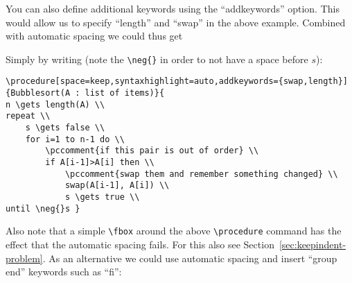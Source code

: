 \documentclass[a4paper]{report}
\begin{document}
You can also define additional keywords using the \enquote{addkeywords} option. This would allow us to specify \enquote{length} and \enquote{swap} in the above example. Combined with automatic spacing we could thus get
\begin{center}
\end{center}
Simply by writing (note the \lstinline$\neg{}$ in order to not have a space before $s$):
\begin{lstlisting}
\procedure[space=keep,syntaxhighlight=auto,addkeywords={swap,length}]{Bubblesort(A : list of items)}{
n \gets length(A) \\
repeat \\
    s \gets false \\
    for i=1 to n-1 do \\
        \pccomment{if this pair is out of order} \\
        if A[i-1]>A[i] then \\
            \pccomment{swap them and remember something changed} \\
            swap(A[i-1], A[i]) \\
            s \gets true \\
until \neg{}s }
\end{lstlisting}
Also note that a simple \lstinline$\fbox$ around the above \lstinline$\procedure$ command has the effect that the automatic spacing fails.
For this also see Section~\ref{sec:keepindent-problem}. As an alternative we could use automatic spacing and insert \enquote{group end}
keywords such as \enquote{fi}:
\begin{center}
\end{center}
\end{document}

